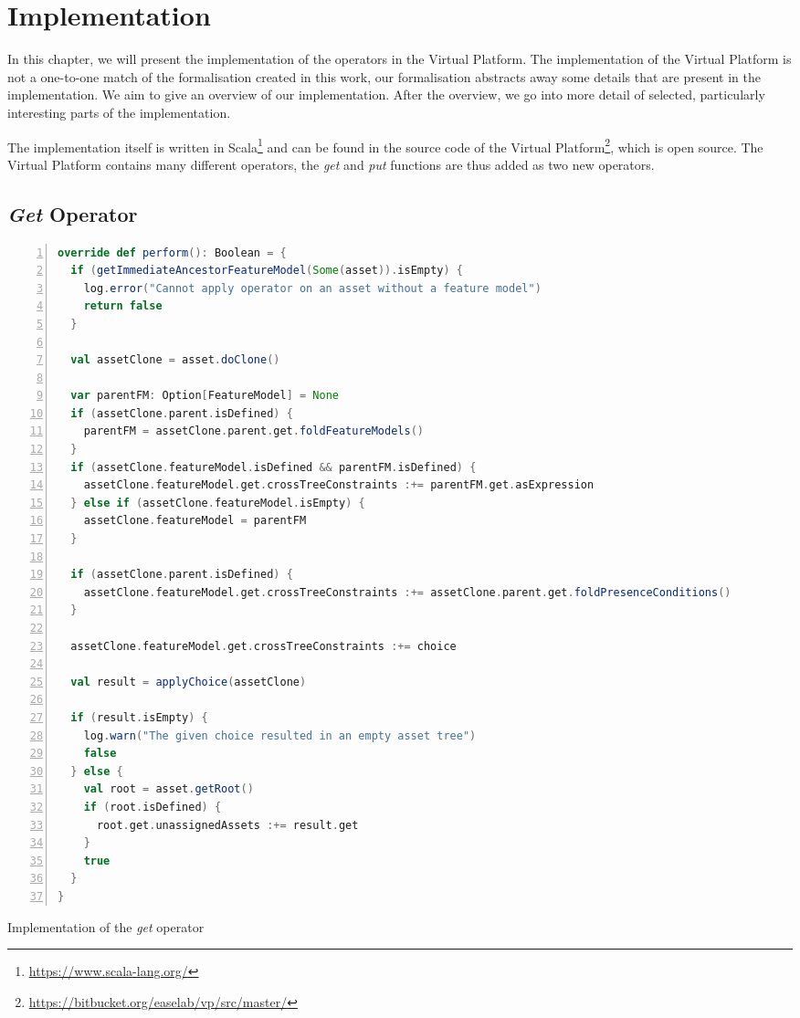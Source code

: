 \chapter{Implementation}\label{ch:implementation}
In this chapter, we will present the implementation of the operators in the
Virtual Platform. The implementation of the Virtual Platform is not a one-to-one match
of the formalisation created in this work, our formalisation abstracts away some details
that are present in the implementation. We aim to give an overview of our implementation.
After the overview, we go into more detail of selected, particularly interesting parts of the implementation.

The implementation itself is written in Scala\footnote{\url{https://www.scala-lang.org/}} and
can be found in the source code of the Virtual Platform\footnote{\url{https://bitbucket.org/easelab/vp/src/master/}},
which is open source. The Virtual Platform contains many different operators, the \emph{get}
and \emph{put} functions are thus added as two new operators. 

\section{\emph{Get} Operator}
\begin{lstfloat}
\begin{lstlisting}[language=Scala,numbers=left,showstringspaces=false]
override def perform(): Boolean = {
  if (getImmediateAncestorFeatureModel(Some(asset)).isEmpty) {
    log.error("Cannot apply operator on an asset without a feature model")
    return false
  }
  
  val assetClone = asset.doClone()
  
  var parentFM: Option[FeatureModel] = None
  if (assetClone.parent.isDefined) {
    parentFM = assetClone.parent.get.foldFeatureModels()
  }
  if (assetClone.featureModel.isDefined && parentFM.isDefined) {
    assetClone.featureModel.get.crossTreeConstraints :+= parentFM.get.asExpression
  } else if (assetClone.featureModel.isEmpty) {
    assetClone.featureModel = parentFM
  }
  
  if (assetClone.parent.isDefined) {
    assetClone.featureModel.get.crossTreeConstraints :+= assetClone.parent.get.foldPresenceConditions()
  }
  
  assetClone.featureModel.get.crossTreeConstraints :+= choice
  
  val result = applyChoice(assetClone)
  
  if (result.isEmpty) {
    log.warn("The given choice resulted in an empty asset tree")
    false
  } else {
    val root = asset.getRoot()
    if (root.isDefined) {
      root.get.unassignedAssets :+= result.get
    }
    true
  }
}
\end{lstlisting}
\caption{Implementation of the \emph{get} operator}
\label{lst:getoperator}
\end{lstfloat}

